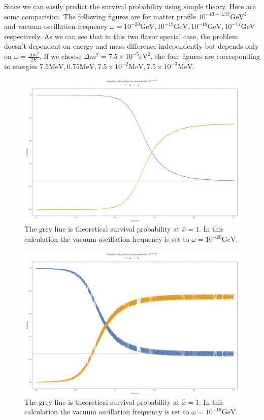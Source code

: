 \documentclass[letterpaper,12pt,english]{sphinxmanual}
\begin{document}
Since we can easily predict the survival probability using simple theory. Here are some comparision. The following figures are for matter profile \(10^{-13-4.3\hat x}\mathrm{GeV^3}\) and vacuum oscillation frequency \(\omega = 10^{-20} \mathrm{GeV}, 10^{-19} \mathrm{GeV},10^{-18} \mathrm{GeV},10^{-17} \mathrm{GeV}\) respectively. As we can see that in this two flavor special case, the problem doesn't dependent on energy and mass difference independently but depends only on \(\omega=\frac{\Delta m^2}{2E}\). If we choose \(\Delta m^2=7.5\times 10^{-5}\mathrm{eV^2}\), the four figures are corresponding to energies \(7.5\mathrm{MeV},0.75\mathrm{MeV},7.5\times 10^{-2}\mathrm{MeV},7.5\times 10^{-3}\mathrm{MeV}\).
\begin{figure}[htbp]
\centering
\capstart

\includegraphics{compThNu13-1.png}
\caption{The grey line is theoretical survival probability at \(\hat x = 1\). In this calculation the vacuum oscillation frequency is set to \(\omega = 10^{-20} \mathrm{GeV}\).}\end{figure}
\begin{figure}[htbp]
\centering
\capstart

\includegraphics{compThNu13-2.png}
\caption{The grey line is theoretical survival probability at \(\hat x = 1\). In this calculation the vacuum oscillation frequency is set to \(\omega = 10^{-19} \mathrm{GeV}\).}\end{figure}
\end{document}
